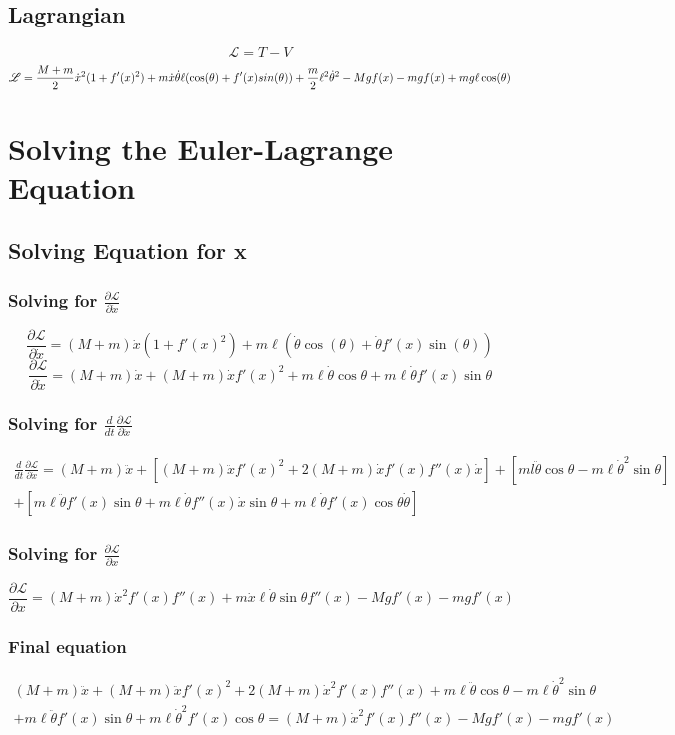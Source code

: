 \documentclass{article}
\begin{document}
\subsection{Lagrangian}
\[\mathscr{L}=T-V\]
\[
\mathscr{L}=\frac{M+m}2 \dot x^2(1+f'(x)^2)+m \dot x \dot \theta \ell (\cos(\theta)+f'(x)\\sin(\theta))+\frac m2 \ell^2
\dot \theta^2-Mgf(x)-mgf(x)+mg\ell \cos(\theta)
\]


\section{Solving the Euler-Lagrange Equation}
\subsection{Solving Equation for x}
\subsubsection{Solving for $\frac{\partial\mathscr L}{\partial \dot x}$}
\[
\frac{\partial \mathscr L}{\partial \dot x}
=(M+m)\dot x (1+f'(x)^2)+m \ell(\dot \theta \cos(\theta)+\dot \theta f'(x)\sin(\theta))
\]
\[
\frac{\partial \mathscr L}{\partial \dot x}
=(M+m)\dot x + (M+m)\dot x f'(x)^2 +m\ell\dot \theta\cos\theta+m\ell\dot\theta f'(x)\sin\theta
\]
\subsubsection{Solving for $\frac{d}{dt}\frac{\partial\mathscr L}{\partial \dot x}$}
\begin{equation}
\begin{aligned}
\frac d{dt}\frac{\partial \mathscr L}{\partial \dot x}=
(M+m)\ddot x+[(M+m)\ddot xf'(x)^2+2(M+m)\dot xf'(x)f''(x)\dot x]+[ml\ddot \theta \cos\theta-m\ell\dot\theta^2\sin\theta]
\\+[m\ell\ddot \theta f'(x)\sin\theta+m\ell\dot\theta f''(x)\dot x \sin\theta +m\ell\dot\theta f'(x)\cos\theta\dot\theta]
\end{aligned}
\end{equation}
\subsubsection{Solving for $\frac{\partial\mathscr L}{\partial x}$}
\[
\frac{\partial \mathscr L}{\partial x}
=(M+m)\dot x^2f'(x)f''(x)+m\dot x\ell \dot \theta \sin \theta f''(x)-Mgf'(x)-mgf'(x)
\]

\subsubsection{Final equation}
\begin{equation}
\begin{aligned}
(M+m)\ddot x+(M+m)\ddot xf'(x)^2 +2(M+m)\dot x^2f'(x)f''(x)+m\ell\ddot\theta\cos\theta-m\ell\dot\theta^2\sin\theta\\+m\ell\ddot\theta f'(x)\sin\theta+m\ell\dot\theta^2f'(x)\cos\theta=(M+m)\dot x^2 f'(x)f''(x)-Mgf'(x)-mgf'(x)
\end{aligned}
\end{equation}
\end{document}
